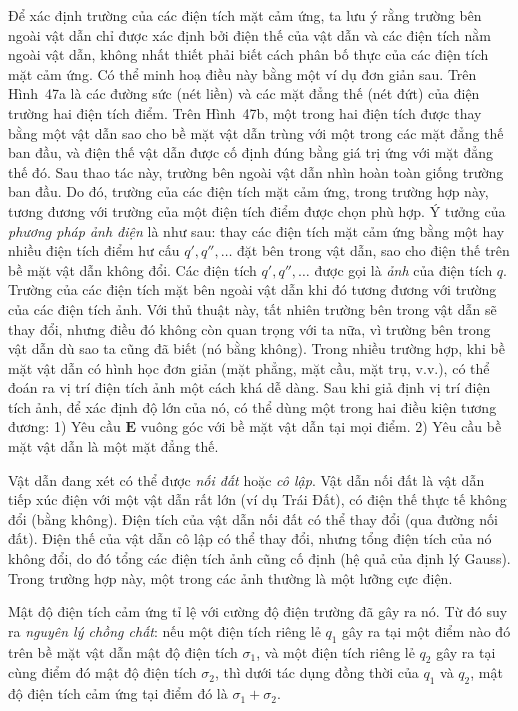 Để xác định trường của các điện tích mặt cảm ứng, ta lưu ý rằng trường bên ngoài vật dẫn chỉ được xác định bởi điện thế của vật dẫn và các điện tích nằm ngoài vật dẫn, không nhất thiết phải biết cách phân bố thực của các điện tích mặt cảm ứng. Có thể minh hoạ điều này bằng một ví dụ đơn giản sau. Trên Hình~47a là các đường sức (nét liền) và các mặt đẳng thế (nét đứt) của điện trường hai điện tích điểm. Trên Hình~47b, một trong hai điện tích được thay bằng một vật dẫn sao cho bề mặt vật dẫn trùng với một trong các mặt đẳng thế ban đầu, và điện thế vật dẫn được cố định đúng bằng giá trị ứng với mặt đẳng thế đó. Sau thao tác này, trường bên ngoài vật dẫn nhìn hoàn toàn giống trường ban đầu. Do đó, trường của các điện tích mặt cảm ứng, trong trường hợp này, tương đương với trường của một điện tích điểm được chọn phù hợp. Ý tưởng của \emph{phương pháp ảnh điện} là như sau: thay các điện tích mặt cảm ứng bằng một hay nhiều điện tích điểm hư cấu $q', q'', \dots$ đặt bên trong vật dẫn, sao cho điện thế trên bề mặt vật dẫn không đổi. Các điện tích $q', q'', \dots$ được gọi là \emph{ảnh} của điện tích $q$. Trường của các điện tích mặt bên ngoài vật dẫn khi đó tương đương với trường của các điện tích ảnh. Với thủ thuật này, tất nhiên trường bên trong vật dẫn sẽ thay đổi, nhưng điều đó không còn quan trọng với ta nữa, vì trường bên trong vật dẫn dù sao ta cũng đã biết (nó bằng không). Trong nhiều trường hợp, khi bề mặt vật dẫn có hình học đơn giản (mặt phẳng, mặt cầu, mặt trụ, v.v.), có thể đoán ra vị trí điện tích ảnh một cách khá dễ dàng. Sau khi giả định vị trí điện tích ảnh, để xác định độ lớn của nó, có thể dùng một trong hai điều kiện tương đương: 1) Yêu cầu $\mathbf{E}$ vuông góc với bề mặt vật dẫn tại mọi điểm. 2) Yêu cầu bề mặt vật dẫn là một mặt đẳng thế.

Vật dẫn đang xét có thể được \emph{nối đất} hoặc \emph{cô lập}. Vật dẫn nối đất là vật dẫn tiếp xúc điện với một vật dẫn rất lớn (ví dụ Trái Đất), có điện thế thực tế không đổi (bằng không). Điện tích của vật dẫn nối đất có thể thay đổi (qua đường nối đất). Điện thế của vật dẫn cô lập có thể thay đổi, nhưng tổng điện tích của nó không đổi, do đó tổng các điện tích ảnh cũng cố định (hệ quả của định lý Gauss). Trong trường hợp này, một trong các ảnh thường là một lưỡng cực điện.

Mật độ điện tích cảm ứng tỉ lệ với cường độ điện trường đã gây ra nó. Từ đó suy ra \emph{nguyên lý chồng chất}: nếu một điện tích riêng lẻ $q_1$ gây ra tại một điểm nào đó trên bề mặt vật dẫn mật độ điện tích $\sigma_1$, và một điện tích riêng lẻ $q_2$ gây ra tại cùng điểm đó mật độ điện tích $\sigma_2$, thì dưới tác dụng đồng thời của $q_1$ và $q_2$, mật độ điện tích cảm ứng tại điểm đó là $\sigma_1+\sigma_2$.


